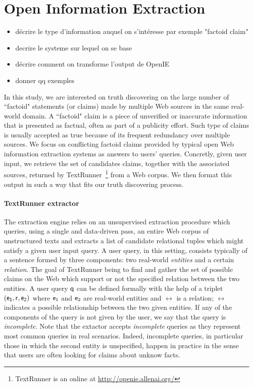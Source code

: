 \section{Open Information Extraction}
\begin{itemize}
 \item décrire le type d'information auquel on s'intéresse par exemple "factoid claim"
 \item decrire le systeme sur lequel on se base
 \item décrire comment on transforme l'output de OpenIE
 \item donner qq exemples
\end{itemize}


In this study, we are interested on truth discovering on the large number of ``factoid" statements
(or claims) made by multiple Web sources in the same real-world domain. A ``factoid" claim is
a piece of unverified or inaccurate information that is presented as factual, often
as part of a publicity effort. Such type of claims  is usually accepted as true  because of its
frequent redundancy over multiple sources. We focus on conflicting factoid claims provided by typical 
open Web information extraction systems as answers to users' queries. Concretly, given user input, 
we retrieve the set of candidates claims, together with the associated sources, returned by TextRunner~\footnote{TextRunner is an online
at \href{http://openie.allenai.org/}{http://openie.allenai.org/}}
from a Web corpus. We then format this output in such a way that fits our truth discovering process.



\paragraph*{TextRunner extractor}
The extraction engine relies on an unsupervised extraction procedure which queries, using a single and data-driven 
pass, an entire Web corpus of unstructured texts and extracts a list of candidate relational tuples which might
satisfy a given user input query. A user query, in this setting, consists typically of a sentence formed by three
components: two real-world \emph{entities} and a certain \emph{relation}. The goal of TextRunner being to find and
gather the set of possible claims on the Web which support or not the specified relation between the two entities. 
A user query $\mathsf{q}$ can be defined formally with the help of a triplet $(\mathsf{e_{1}}, \mathsf{r}_{}, \mathsf{e_{2}})$ where $\mathsf{e_{1}}$ and $\mathsf{e_{2}}$ 
are real-world entities and $\rel{}$ is a relation; $\rel{}$ indicates a possible relationship between the
two given entities. If any of the components of the query is not given by the user, we say that the query is \emph{incomplete}.
Note that the extactor accepts \emph{incomplete} queries as they represent most common queries in real scenarios.
Indeed, incomplete queries, in particular those in which the second entity is unspecified, happen in practice in the sense 
that users are often looking for claims about unknow facts.

